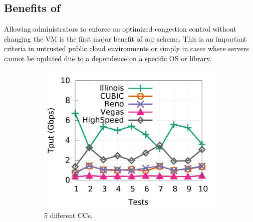 \subsection{Benefits of~\acdc{}}
Allowing administrators to enforce an optimized congestion control without
changing the VM is the first major benefit of our scheme.
This is an important criteria in untrusted public cloud environments or simply in cases where servers cannot be updated
due to a dependence on a specific OS or library.~\cite{judd2015nsdi}


\begin{figure}[!t]
        \centering
        \begin{subfigure}[b]{0.45\textwidth}
                \centering
		\includegraphics[width=\textwidth]{acdctcp/figures/tput_fairness/default_5CC_tput_detail.pdf}
		\caption{5 different CCs.}
                \label{unfairness_5CC}
        \end{subfigure}
        \begin{subfigure}[b]{0.45\textwidth}
                \centering

\end{subfigure}
\end{figure}
